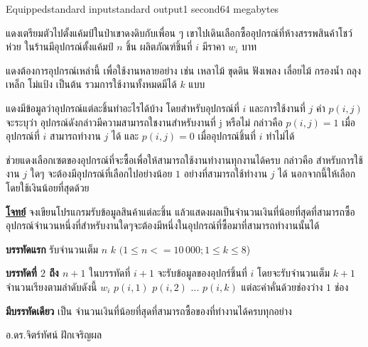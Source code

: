 \documentclass[11pt,a4paper]{article}
\begin{document}
\begin{problem}{Equipped}{standard input}{standard output}{1 second}{64 megabytes}

แดงเตรียมตัวไปตั้งแค้มป์ในป่าเขาดงดิบกับเพื่อน ๆ เขาไปเดินเลือกซื้ออุปกรณ์ที่ห้างสรรพสินค้าโชว์ห่วย ในร้านมีอุปกรณ์ตั้งแค้มป์ $n$ ชิ้น ผลิตภัณฑ์ชิ้นที่ $i$ มีราคา $w_i$ บาท

แดงต้องการอุปกรณ์เหล่านี้ เพื่อใช้งานหลายอย่าง เช่น เหลาไม้ ขุดดิน ฟังเพลง เลื่อยไม้ กรองน้ำ ถลุงเหล็ก โม่แป้ง เป็นต้น รวมการใช้งานทั้งหมดมีได้ $k$ แบบ

แดงมีข้อมูลว่าอุปกรณ์แต่ละชิ้นทำอะไรได้บ้าง โดยสำหรับอุปกรณ์ที่ $i$ และการใช้งานที่ $j$ ค่า $p(i,j)$ จะระบุว่า อุปกรณ์ดังกล่าวมีความสามารถใชงานสำหรับงานที่ j หรือไม่ กล่าวคือ $p(i,j) = 1$ เมื่ออุปกรณ์ที่ $i$ สามารถทำงาน $j$ ได้ และ $p(i,j) = 0$ เมื่ออุปกรณ์ชิ้นที่ $i$ ทำไม่ได้

ช่วยแดงเลือกเซตของอุปกรณ์ที่จะซื้อเพื่อให้สามารถใช้งานทำงานทุกงานได้ครบ กล่าวคือ สำหรับการใช้งาน $j$ ใดๆ จะต้องมีอุปกรณ์ที่เลือกไปอย่างน้อย $1$ อย่างที่สามารถใช้ทำงาน $j$ ได้ นอกจากนี้ให้เลือกโดยใช้เงินน้อยที่สุดด้วย

\bigskip
\underline{\textbf{โจทย์}}  จงเขียนโปรแกรมรับข้อมูลสินค้าแต่ละชิ้น แล้วแสดงผลเป็นจำนวนเงินที่น้อยที่สุดที่สามารถซื้ออุปกรณ์จำนวนหนึ่งที่สำหรับงานใดๆจะต้องมีหนึ่งในอุปกรณ์ที่ซื้อมาที่สามารถทำงานนั้นได้

\InputFile

\textbf{บรรทัดแรก} รับจำนวนเต็ม $n$  $k$ $(1 \leq n <= 10\,000; 1 \leq k \leq 8$) 

\textbf{บรรทัดที่ $2$ ถึง $n+1$} ในบรรทัดที่ $i+1$ จะรับข้อมูลของอุปกร์ชิ้นที่ $i$ โดยจะรับจำนวนเต็ม $k+1$ จำนวนเรียงตามลำดับดังนี้ $w_i$ $p(i,1)$ $p(i,2)$ $. . .$ $p(i,k)$ แต่ละค่าคั่นด้วยช่องว่าง $1$ ช่อง

\OutputFile
\textbf{มีบรรทัดเดียว} เป็น
จำนวนเงินที่น้อยที่สุดที่สามารถซื้อของที่ทำงานได้ครบทุกอย่าง

\Examples

\begin{example}
%
\end{example}


\Source

อ.ดร.จิตร์ทัศน์ ฝักเจริญผล

\end{problem}
\end{document}
